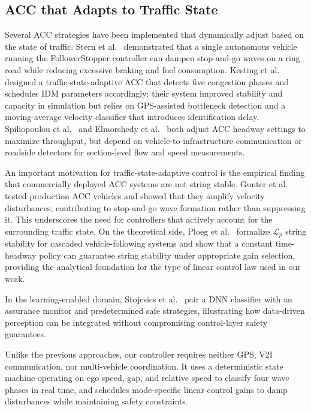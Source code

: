 \documentclass[conference]{IEEEtran}
\begin{document}
\subsection{ACC that Adapts to Traffic State}
Several ACC strategies have been implemented that dynamically adjust based on the state of traffic. Stern et al.\ \cite{STERN2018205} demonstrated that a single autonomous vehicle running the FollowerStopper controller can dampen stop-and-go waves on a ring road while reducing excessive braking and fuel consumption. Kesting et al.\ \cite{KESTING2008668} designed a traffic-state-adaptive ACC that detects five congestion phases and schedules IDM parameters accordingly; their system improved stability and capacity in simulation but relies on GPS-assisted bottleneck detection and a moving-average velocity classifier that introduces identification delay. Spiliopoulou et al.\ \cite{doi:10.1177/0361198118796020} and Elmorshedy et al.\ \cite{doi:10.1177/03611981231152459} both adjust ACC headway settings to maximize throughput, but depend on vehicle-to-infrastructure communication or roadside detectors for section-level flow and speed measurements.

An important motivation for traffic-state-adaptive control is the empirical finding that commercially deployed ACC systems are not string stable. Gunter et al.\ \cite{Gunter2021StringStable} tested production ACC vehicles and showed that they amplify velocity disturbances, contributing to stop-and-go wave formation rather than suppressing it. This underscores the need for controllers that actively account for the surrounding traffic state. On the theoretical side, Ploeg et al.\ \cite{Ploeg2014} formalize $\mathcal{L}_p$ string stability for cascaded vehicle-following systems and show that a constant time-headway policy can guarantee string stability under appropriate gain selection, providing the analytical foundation for the type of linear control law used in our work.

In the learning-enabled domain, Stojcsics et al.\ \cite{s21186089} pair a DNN classifier with an assurance monitor and predetermined safe strategies, illustrating how data-driven perception can be integrated without compromising control-layer safety guarantees.

Unlike the previous approaches, our controller requires neither GPS, V2I communication, nor multi-vehicle coordination. It uses a deterministic state machine operating on ego speed, gap, and relative speed to classify four wave phases in real time, and schedules mode-specific linear control gains to damp disturbances while maintaining safety constraints.
\end{document}
